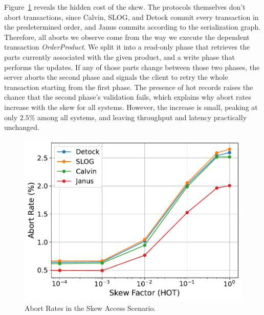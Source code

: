 \documentclass{article}
\begin{document}
Figure~\ref{fig: abort-rates} reveals the hidden cost of the skew. The protocols themselves don't abort transactions, since Calvin, SLOG, and Detock commit every transaction in the predetermined order, and Janus commits according to the serialization graph. Therefore, all aborts we observe come from the way we execute the dependent transaction \textit{OrderProduct}. We split it into a read-only phase that retrieves the parts currently associated with the given product, and a write phase that performs the updates. If any of those parts change between those two phases, the server aborts the second phase and signals the client to retry the whole transaction starting from the first phase. The presence of hot records raises the chance that the second phase's validation fails, which explains why abort rates increase with the skew for all systems. However, the increase is small, peaking at only $2.5\%$ among all systems, and leaving throughput and latency practically unchanged.

\begin{figure}[ht]
  \centering
  \includegraphics[width=\columnwidth]{figures/Abort Rates.pdf}
  \caption{Abort Rates in the Skew Access Scenario.}
  \label{fig: abort-rates}
\end{figure}
\end{document}
